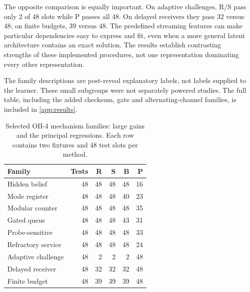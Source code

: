 The opposite comparison is equally important. On adaptive challenges, R/S pass only 2 of 48 slots while P passes all 48. On delayed receivers they pass 32 versus 48; on finite budgets, 39 versus 48. The predefined streaming features can make particular dependencies easy to express and fit, even when a more general latent architecture contains an exact solution. The results establish contrasting strengths of these implemented procedures, not one representation dominating every other representation.

The family descriptions are post-reveal explanatory labels, not labels supplied to the learner. These small subgroups were not separately powered studies. The full table, including the added checksum, gate and alternating-channel families, is included in \cref{app:results}.


\begin{table}[tbp]
\centering
\caption{Selected OII-4 mechanism families: large gains and the principal regressions. Each row contains two fixtures and 48 test slots per method.}\label{tab:families}
\small
\setlength{\tabcolsep}{5pt}
\begin{tabular}{lrrrrr}
\toprule
Family & Tests & R & S & B & P \\
\midrule
Hidden belief & 48 & 48 & 48 & 48 & 16 \\
Mode register & 48 & 48 & 48 & 40 & 23 \\
Modular counter & 48 & 48 & 48 & 48 & 35 \\
Gated queue & 48 & 48 & 48 & 43 & 31 \\
Probe-sensitive & 48 & 48 & 48 & 48 & 33 \\
Refractory service & 48 & 48 & 48 & 48 & 24 \\
Adaptive challenge & 48 & 2 & 2 & 2 & 48 \\
Delayed receiver & 48 & 32 & 32 & 32 & 48 \\
Finite budget & 48 & 39 & 39 & 39 & 48 \\
\bottomrule
\end{tabular}
\par{}
\end{table}



